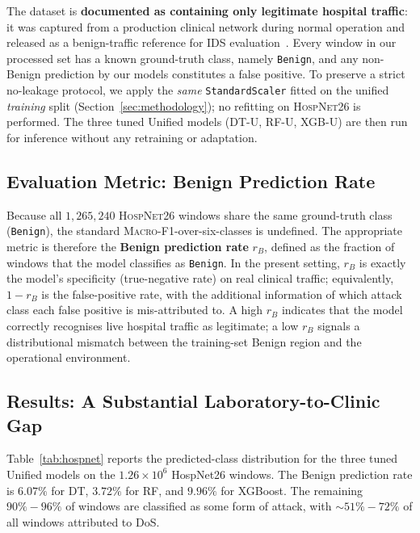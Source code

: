 \documentclass[runningheads]{llncs}
\newcommand{\macroF}{\textsc{Macro-F1}}
\begin{document}
The dataset is \textbf{documented as containing only legitimate hospital traffic}: it was captured from a production clinical network during normal operation and released as a benign-traffic reference for IDS evaluation~\cite{hospnet26,Domenech2026_cbms}. Every window in our processed set has a known ground-truth class, namely \texttt{Benign}, and any non-Benign prediction by our models constitutes a false positive. To preserve a strict no-leakage protocol, we apply the \emph{same} \texttt{StandardScaler} fitted on the unified \emph{training} split (Section~\ref{sec:methodology}); no refitting on \textsc{HospNet26} is performed. The three tuned Unified models (DT-U, RF-U, XGB-U) are then run for inference without any retraining or adaptation.

\subsection{Evaluation Metric: Benign Prediction Rate}

Because all $1{,}265{,}240$ \textsc{HospNet26} windows share the same ground-truth class (\texttt{Benign}), the standard \macroF{}-over-six-classes is undefined. The appropriate metric is therefore the \textbf{Benign prediction rate} $r_{B}$, defined as the fraction of windows that the model classifies as \texttt{Benign}. In the present setting, $r_{B}$ is exactly the model's specificity (true-negative rate) on real clinical traffic; equivalently, $1\!-\!r_{B}$ is the false-positive rate, with the additional information of which attack class each false positive is mis-attributed to. A high $r_{B}$ indicates that the model correctly recognises live hospital traffic as legitimate; a low $r_{B}$ signals a distributional mismatch between the training-set Benign region and the operational environment.

\subsection{Results: A Substantial Laboratory-to-Clinic Gap}

Table~\ref{tab:hospnet} reports the predicted-class distribution for the three tuned Unified models on the $1.26 \times 10^{6}$ HospNet26 windows. The Benign prediction rate is $6.07\%$ for DT, $3.72\%$ for RF, and $9.96\%$ for XGBoost. The remaining $90\%\!-\!96\%$ of windows are classified as some form of attack, with $\sim$$51\%\!-\!72\%$ of all windows attributed to DoS.
\end{document}
